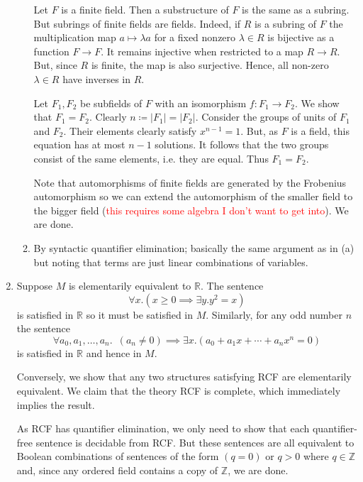 \documentclass{article}
\theoremstyle{theorem}
\begin{document}
\begin{enumerate}[leftmargin=*]
\begin{enumerate}
		Let $F$ is a finite field. Then a substructure of $F$ is the same as a subring. But subrings of finite fields are fields. Indeed, if $R$ is a subring of $F$ the multiplication map $a \mapsto \lambda a$ for a fixed nonzero $\lambda \in R$ is bijective as a function $F \to F$. It remains injective when restricted to a map $R \to R$. But, since $R$ is finite, the map is also surjective. Hence, all non-zero $\lambda \in R$ have inverses in $R$.
		
		Let $F_1,F_2$ be subfields of $F$ with an isomorphism $f\colon F_1 \to F_2$. We show that $F_1 = F_2$. Clearly $n\coloneqq |F_1| = |F_2|$. Consider the groups of units of $F_1$ and $F_2$. Their elements clearly satisfy $x^{n-1} = 1$. But, as $F$ is a field, this equation has at most $n-1$ solutions. It follows that the two groups consist of the same elements, i.e. they are equal. Thus $F_1 = F_2$.
		
		Note that automorphisms of finite fields are generated by the Frobenius automorphism so we can extend the automorphism of the smaller field to the bigger field (\textcolor{red}{this requires some algebra I don't want to get into}). We are done.
		\item By syntactic quantifier elimination; basically the same argument as in (a) but noting that terms are just linear combinations of variables.
		\end{enumerate}
		\item Suppose $M$ is elementarily equivalent to $\mathbb{R}$. The sentence
		\[
			\forall x. (x\geq 0 \implies \exists y. y^2 = x)
		\]
		is satisfied in $\mathbb{R}$ so it must be satisfied in $M$. Similarly, for any odd number $n$ the sentence
		\[
			\forall a_0,a_1,\ldots,a_{n}. \,\,\,(a_n \neq 0) \implies \exists x. (a_0 + a_1x +\cdots +a_nx^n = 0)
		\]
		is satisfied in $\mathbb{R}$ and hence in $M$.
		
		Conversely, we show that any two structures satisfying RCF are elementarily equivalent. We claim that the theory RCF is complete, which immediately implies the result.
		
		As RCF has quantifier elimination, we only need to show that each quantifier-free sentence is decidable from RCF. But these sentences are all equivalent to Boolean combinations of sentences of the form $(q = 0)$ or $q>0$ where $q\in \mathbb{Z}$ and, since any ordered field contains a copy of $\mathbb{Z}$, we are done.
		

\end{enumerate}
\end{document}
